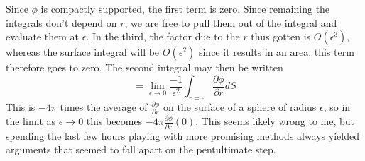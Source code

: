 \documentclass{article}
\begin{document}
Since $\phi$ is compactly supported, the first term is zero. Since remaining the integrals don't depend on $r$, we are free to pull them out of the integral and evaluate them at $\epsilon$. In the third, the factor due to the $r$ thus gotten is $O(\epsilon^3)$, whereas the surface integral will be $O(\epsilon^2)$ since it results in an area; this term therefore goes to zero. The second integral may then be written
\[=\lim_{\epsilon\to 0}\frac{-1}{\epsilon^2}\int_{r=\epsilon}\frac{\partial\phi}{\partial r}dS\]
This is $-4\pi$ times the average of $\frac{\partial \phi}{\partial r}$ on the surface of a sphere of radius $\epsilon$, so in the limit as $\epsilon\to 0$ this becomes $-4\pi\frac{\partial \phi}{\partial r}(0)$. This seems likely wrong to me, but spending the last few hours playing with more promising methods always yielded arguments that seemed to fall apart on the pentultimate step.
\end{document}
